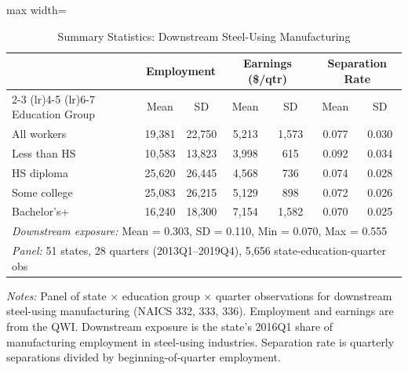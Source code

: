 \begin{table}[t]
\centering
\caption{Summary Statistics: Downstream Steel-Using Manufacturing}
\label{tab:summary}
\begin{adjustbox}{max width=\textwidth}
\begin{tabular}{lcccccc}
\toprule
 & \multicolumn{2}{c}{Employment} & \multicolumn{2}{c}{Earnings (\$/qtr)} & \multicolumn{2}{c}{Separation Rate} \\
\cmidrule(lr){2-3} \cmidrule(lr){4-5} \cmidrule(lr){6-7}
Education Group & Mean & SD & Mean & SD & Mean & SD \\
\midrule
All workers & 19,381 & 22,750 & 5,213 & 1,573 & 0.077 & 0.030 \\
\midrule
Less than HS & 10,583 & 13,823 & 3,998 & 615 & 0.092 & 0.034 \\
HS diploma & 25,620 & 26,445 & 4,568 & 736 & 0.074 & 0.028 \\
Some college & 25,083 & 26,215 & 5,129 & 898 & 0.072 & 0.026 \\
Bachelor's+ & 16,240 & 18,300 & 7,154 & 1,582 & 0.070 & 0.025 \\
\midrule
\multicolumn{7}{l}{\textit{Downstream exposure:} Mean = 0.303, SD = 0.110, Min = 0.070, Max = 0.555} \\
\multicolumn{7}{l}{\textit{Panel:} 51 states, 28 quarters (2013Q1--2019Q4), 5,656 state-education-quarter obs} \\
\bottomrule
\end{tabular}
\end{adjustbox}
\par\vspace{0.3em}
{\footnotesize \textit{Notes:} Panel of state $\times$ education group $\times$ quarter observations for downstream steel-using manufacturing (NAICS 332, 333, 336). Employment and earnings are from the QWI. Downstream exposure is the state's 2016Q1 share of manufacturing employment in steel-using industries. Separation rate is quarterly separations divided by beginning-of-quarter employment.
}
\end{table}
